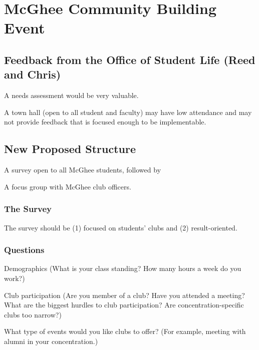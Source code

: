 \documentclass[10pt]{meetingmins}
\begin{document}
\maketitle

\section{McGhee Community Building Event}
\subsection{Feedback from the Office of Student Life (Reed and Chris)}
\begin{subitems}
	\item A needs assessment would be very valuable.
	\item A town hall (open to all student and faculty) may have low attendance and may not provide feedback that is focused enough to be implementable.
	\end{subitems}
\subsection{New Proposed Structure} 
\begin{subsubitems}
\item A survey open to all McGhee students, followed by 
\item A focus group with McGhee club officers.
\end{subsubitems}
\subsubsection{The Survey}
The survey should be (1) focused on students' clubs and (2) result-oriented. 
\subsubsection{Questions}
\begin{subsubitems}
\item Demographics (What is your class standing? How many hours a week do you work?)
\item Club participation (Are you member of a club?  Have you attended a meeting? What are the biggest hurdles to club participation? Are concentration-specific clubs too narrow?)
\item What type of events would you like clubs to offer? (For example, meeting with alumni in your concentration.) 
\end{subsubitems} 
\end{document}
